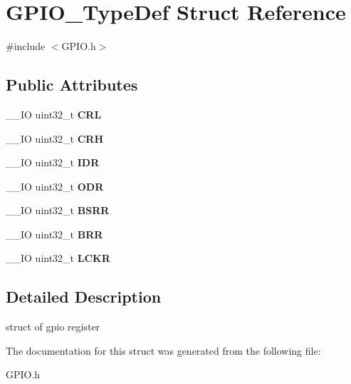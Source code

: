 \hypertarget{struct_g_p_i_o___type_def}{}\section{G\+P\+I\+O\+\_\+\+Type\+Def Struct Reference}
\label{struct_g_p_i_o___type_def}


{\ttfamily \#include $<$G\+P\+I\+O.\+h$>$}

\subsection*{Public Attributes}
\begin{DoxyCompactItemize}
\item 
\mbox{\label{struct_g_p_i_o___type_def_a218d21e9ca712cec4ca8f00406b2ec29}} 
\+\_\+\+\_\+\+IO uint32\+\_\+t {\bfseries C\+RL}
\item 
\mbox{\label{struct_g_p_i_o___type_def_afe53502a3dbf9e7dcf9ac83f67ac481d}} 
\+\_\+\+\_\+\+IO uint32\+\_\+t {\bfseries C\+RH}
\item 
\mbox{\label{struct_g_p_i_o___type_def_acf11156409414ad8841bb0b62959ee96}} 
\+\_\+\+\_\+\+IO uint32\+\_\+t {\bfseries I\+DR}
\item 
\mbox{\label{struct_g_p_i_o___type_def_a6fb78f4a978a36032cdeac93ac3c9c8b}} 
\+\_\+\+\_\+\+IO uint32\+\_\+t {\bfseries O\+DR}
\item 
\mbox{\label{struct_g_p_i_o___type_def_acd6f21e08912b484c030ca8b18e11cd6}} 
\+\_\+\+\_\+\+IO uint32\+\_\+t {\bfseries B\+S\+RR}
\item 
\mbox{\label{struct_g_p_i_o___type_def_aab918bfbfae459789db1fd0b220c7f21}} 
\+\_\+\+\_\+\+IO uint32\+\_\+t {\bfseries B\+RR}
\item 
\mbox{\label{struct_g_p_i_o___type_def_a95a59d4b1d52be521f3246028be32f3e}} 
\+\_\+\+\_\+\+IO uint32\+\_\+t {\bfseries L\+C\+KR}
\end{DoxyCompactItemize}


\subsection{Detailed Description}
struct of gpio register 

The documentation for this struct was generated from the following file\+:\begin{DoxyCompactItemize}
\item 
G\+P\+I\+O.\+h\end{DoxyCompactItemize}

